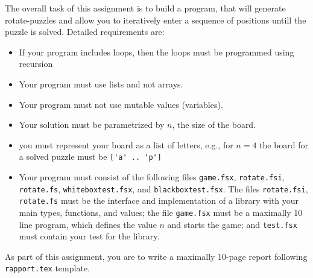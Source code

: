 The overall task of this assignment is to build a program, that will generate rotate-puzzles and allow you to iteratively enter a sequence of positions untill the puzzle is solved. Detailed requirements are:
\begin{itemize}
\item If your program includes loops, then the loops must be programmed using recursion
\item Your program must use lists and not arrays.
\item Your program must not use mutable values (variables).
\item Your solution must be parametrized by $n$, the size of the board.
\item you must represent your board as a list of letters, e.g., for $n=4$ the board for a solved puzzle must be \lstinline{['a' .. 'p']}
\item Your program must consist of the following files \lstinline{game.fsx}, \lstinline{rotate.fsi}, \lstinline{rotate.fs}, \lstinline{whiteboxtest.fsx}, and \lstinline{blackboxtest.fsx}. The files \lstinline{rotate.fsi}, \lstinline{rotate.fs} must be the interface and implementation of a library with your main types, functions, and values; the file \lstinline{game.fsx} must be a maximally 10 line program, which defines the value $n$ and starts the game; and \lstinline{test.fsx} must contain your test for the library.
\end{itemize}
As part of this assignment, you are to write a maximally 10-page report following \lstinline{rapport.tex} template.
